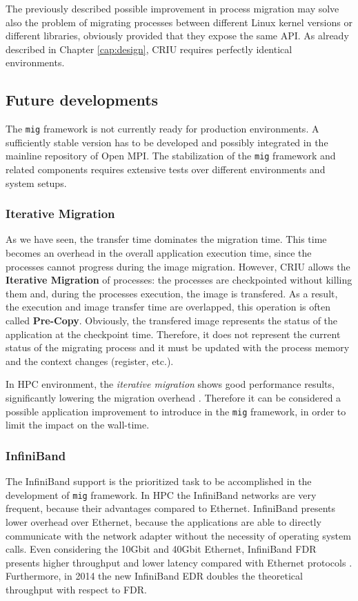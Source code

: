 The previously described possible improvement in process migration may solve also
the problem of migrating processes between different Linux kernel versions or
different libraries, obviously provided that they expose the same API. As already
described in Chapter \ref{cap:design}, CRIU requires perfectly identical environments.

\subsection{Future developments}
The \texttt{mig} framework is not currently ready for production environments.
A sufficiently stable version has to be developed and possibly integrated
in the mainline repository of Open MPI. The stabilization of the \texttt{mig}
framework and related components requires extensive tests over different
environments and system setups. 

\subsubsection{Iterative Migration}
As we have seen, the transfer time dominates the migration time. This time
becomes an overhead in the overall application execution time, since the
processes
cannot progress during the image migration. However,
CRIU allows the \textbf{Iterative Migration} of processes: the processes
are checkpointed without killing them and, during the processes execution,
the image is transfered. As a result, the execution and image transfer time
are overlapped, this operation is often called \textbf{Pre-Copy}.
Obviously, the transfered image represents the
status of the application at the checkpoint time. Therefore, it does not
represent the current status of the migrating process and it must be updated
with the process memory and the context changes (register, etc.).

In HPC environment, the \emph{iterative migration} shows good performance
results, significantly lowering the migration overhead
\cite{wang2008proactive}. Therefore it can be considered a possible application
improvement to introduce in the \texttt{mig} framework, in order to limit the impact on the wall-time.

\subsubsection{InfiniBand}
The InfiniBand support is the prioritized task to be accomplished in the
development of \texttt{mig} framework. In HPC the InfiniBand networks are
very frequent, because their advantages compared to Ethernet.
InfiniBand presents lower overhead over Ethernet, because the applications are
able to directly communicate with the network adapter without the necessity
of operating system calls. Even considering the
10Gbit and 40Gbit Ethernet, InfiniBand FDR presents higher throughput and
lower latency compared with Ethernet protocols \cite{vienne2012performance}.
Furthermore, in 2014 the new InfiniBand EDR doubles the theoretical throughput
with respect to FDR.

